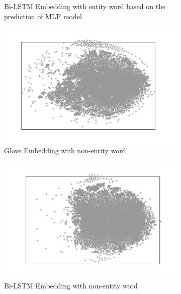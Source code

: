 \documentclass{article}
\begin{document}
\begin{figure}[t]
\begin{subfigure}[t]{0.24\textwidth}
		\caption{Bi-LSTM Embedding with entity word based on the prediction of MLP model}
		\label{fig:bi_lstm_mlp_positive}
	\end{subfigure}

	\bigskip
	
	\begin{subfigure}[t]{0.24\textwidth}
		\includegraphics[width=\linewidth]{glove_embedding_negative_mirror.pdf}
		\caption{Glove Embedding with non-entity word}
		\label{fig:glove_negative}
	\end{subfigure} \hfil
   \begin{subfigure}[t]{0.24\textwidth}
	   \includegraphics[width=\linewidth]{bi_lstm_gold_negative.pdf}
	   \caption{Bi-LSTM Embedding with non-entity word}
	   \label{fig:bi_lstm_gold_negative}
   \end{subfigure} \hfil
	\begin{subfigure}[t]{0.24\textwidth}

\end{subfigure}
\end{figure}
\end{document}
